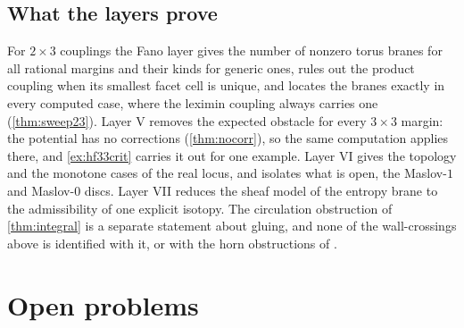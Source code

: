 \documentclass[11pt]{article}
\theoremstyle{definition}
\theoremstyle{remark}
\begin{document}
\subsection{What the layers prove}

For $2\times3$ couplings the Fano layer gives the number of nonzero torus branes for all rational margins and their kinds for generic ones,
rules out the product coupling when its smallest facet cell is unique, and locates the branes exactly in
every computed case, where the leximin coupling always carries one (\cref{thm:sweep23}). Layer V removes the expected obstacle for every $3\times3$ margin: the
potential has no corrections (\cref{thm:nocorr}), so the same computation applies there, and \cref{ex:hf33crit} carries it out for one
example. Layer VI gives the topology and the monotone cases of the real locus, and isolates what is open, the Maslov-$1$ and Maslov-$0$ discs.
Layer VII reduces the sheaf model of the entropy brane to the admissibility of one explicit isotopy. The circulation obstruction of
\cref{thm:integral} is a separate statement about gluing, and none of the wall-crossings above is identified with it, or with the horn
obstructions of \cite[Prop.~6.2]{Bands}.

\section{Open problems}\label{sec:open}
\end{document}
